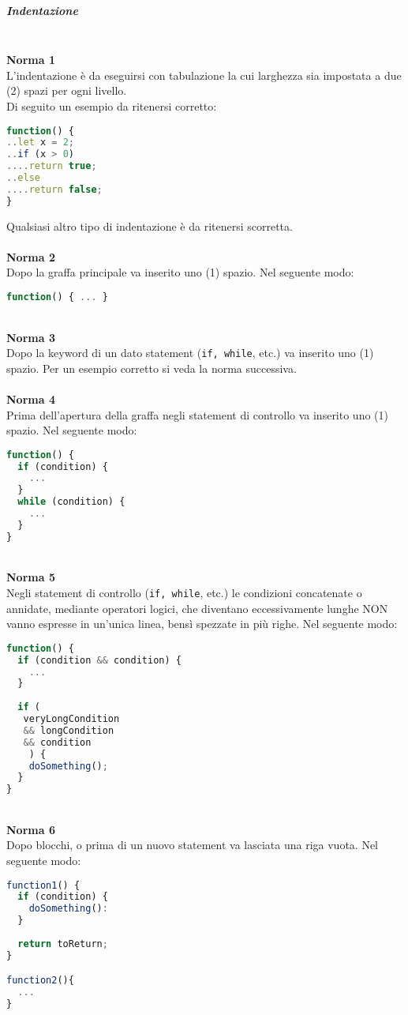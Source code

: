 \subparagraph{Indentazione}\-\\
\textbf{Norma 1}\\
L'indentazione è da eseguirsi con tabulazione la cui larghezza sia impostata a due (2) spazi per ogni livello.\\
Di seguito un esempio da ritenersi corretto:
\begin{lstlisting}[language=JavaScript]
function() {
..let x = 2;
..if (x > 0)
....return true;
..else
....return false;
}
\end{lstlisting}
Qualsiasi altro tipo di indentazione è da ritenersi scorretta.\\
\-\\
\textbf{Norma 2}\\
Dopo la graffa principale va inserito uno (1) spazio. Nel seguente modo:
\begin{lstlisting}[language=JavaScript]
function() { ... }
\end{lstlisting}
\-\\
\textbf{Norma 3}\\
Dopo la keyword di un dato statement (\texttt{if, while}, etc.) va inserito uno (1) spazio. Per un esempio corretto si veda la norma successiva.\\
\-\\
\textbf{Norma 4}\\
Prima dell'apertura della graffa negli statement di controllo va inserito uno (1) spazio. Nel seguente modo:
\begin{lstlisting}[language=JavaScript]
function() {
  if (condition) {
    ...  
  }
  while (condition) {
    ...
  }
}
\end{lstlisting}
\-\\
\textbf{Norma 5}\\
Negli statement di controllo (\texttt{if, while}, etc.) le condizioni concatenate o annidate, mediante operatori logici, che diventano eccessivamente lunghe NON vanno espresse in un'unica linea, bensì spezzate in più righe. Nel seguente modo:
\begin{lstlisting}[language=JavaScript]
function() {
  if (condition && condition) {
    ...  
  }
  
  if (
   veryLongCondition
   && longCondition
   && condition
    ) {
    doSomething();
  }
}
\end{lstlisting}
\-\\
\textbf{Norma 6}\\
Dopo blocchi, o prima di un nuovo statement va lasciata una riga vuota. Nel seguente modo:
\begin{lstlisting}[language=JavaScript]
function1() {
  if (condition) {
    doSomething():  
  }
  
  return toReturn;  
}

function2(){
  ...
}
\end{lstlisting}

